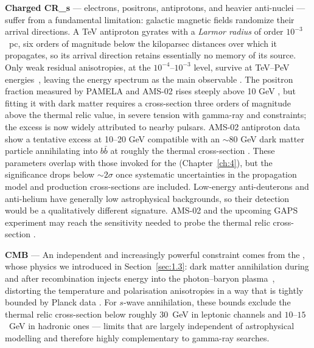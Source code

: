\textbf{Charged \glspl{CR_}} --- electrons, positrons, antiprotons, and heavier anti-nuclei --- suffer from a fundamental limitation: galactic magnetic fields randomize their arrival directions.
A TeV antiproton gyrates with a \emph{Larmor radius} of order $10^{-3}$~pc, six orders of magnitude below the kiloparsec distances over which it propagates, so its arrival direction retains essentially no memory of its source.
Only weak residual anisotropies, at the $10^{-4}$--$10^{-3}$ level, survive at TeV--PeV energies~\cite{Deligny:2016asd}, leaving the energy spectrum as the main observable \cite{Cirelli:2024ssz,Pinetti:2021jjs}.
The positron fraction measured by PAMELA and AMS-02 rises steeply above 10 GeV \cite{PAMELA:2008gwm}, but fitting it with dark matter requires a cross-section three orders of magnitude above the thermal relic value, in severe tension with gamma-ray and \CMB constraints; the excess is now widely attributed to nearby pulsars.
AMS-02 antiproton data show a tentative excess at 10--20 GeV compatible with an $\sim$80 GeV dark matter particle annihilating into $b\bar{b}$ at roughly the thermal cross-section \cite{Cuoco:2016eej}.
These parameters overlap with those invoked for the \GCE (Chapter~\ref{ch:4}), but the significance drops below $\sim 2\sigma$ once systematic uncertainties in the propagation model and production cross-sections are included.
Low-energy anti-deuterons and anti-helium have generally low astrophysical backgrounds, so their detection would be a qualitatively different signature.
AMS-02 and the upcoming GAPS experiment may reach the sensitivity needed to probe the thermal relic cross-section \cite{Hooper:2024}.

\textbf{CMB} --- An independent and increasingly powerful constraint comes from the \CMB, whose physics we introduced in Section~\ref{sec:1.3}: dark matter annihilation during and after recombination injects energy into the photon--baryon plasma~\cite{Lopez-Honorez:2013cua}, distorting the temperature and polarisation anisotropies in a way that is tightly bounded by Planck data \cite{Aghanim:2018eyx}.
For $s$-wave annihilation, these bounds exclude the thermal relic cross-section below roughly $30$~GeV in leptonic channels and $10$--$15$~GeV in hadronic ones \cite{Lopez-Honorez:2013cua, Aghanim:2018eyx} --- limits that are largely independent of astrophysical modelling and therefore highly complementary to gamma-ray searches.


